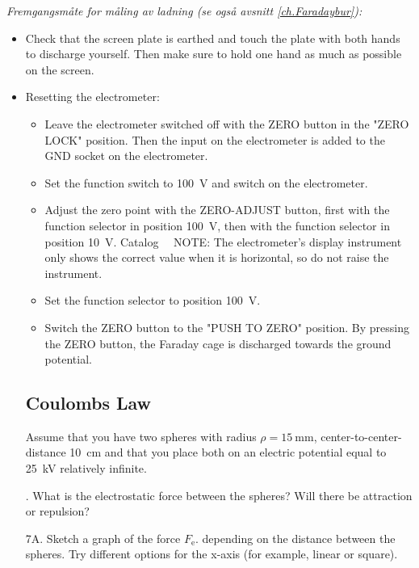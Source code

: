 \documentclass[../Elmag-labhefte-2020.tex]{subfiles}
\begin{document}
\emph{Fremgangsmåte for måling av ladning (se også avsnitt \ref{ch.Faradaybur}):}
\vspace{-4mm}
\begin{itemize}
    \item Check that the screen plate is earthed and touch the plate with both hands to discharge yourself. Then make sure to hold one hand as much as possible on the screen.
    \item Resetting the electrometer:
    \vspace{-2mm}
    \begin{itemize}
        \item Leave the electrometer switched off with the ZERO button in the "ZERO LOCK" position. Then the input on the electrometer is added to the GND socket on the electrometer.
        \item Set the function switch to \SI{100}{\volt} and switch on the electrometer.
        \item Adjust the zero point with the ZERO-ADJUST button, first with the function selector in position \SI{100}{\volt}, then with the function selector in position \SI{10}{\volt}. Catalog \ \
        NOTE: The electrometer's display instrument only shows the correct value when it is horizontal, so do not raise the instrument.
        \item Set the function selector to position \SI{100}{\volt}.
        \item Switch the ZERO button to the "PUSH TO ZERO" position. By pressing the ZERO button, the Faraday cage is discharged towards the ground potential.
    \end{itemize}

\subsection{Coulombs Law \label{ch.coulomb.beregn.coulomb}}

Assume that you have two spheres with radius $\rho = \SI{15}{\milli\m}$, center-to-center-distance \SI{10}{\cm} and that you place both on an electric potential equal to \SI{25}{\kilo\volt} relatively infinite.

{. What is the electrostatic force between the spheres? Will there be attraction or repulsion?}


{\itsf 7A. Sketch a graph of the force $F_\text{e}$. depending on the distance between the spheres.} Try different options for the x-axis (for example, linear or square).


\end{itemize}
\end{document}
